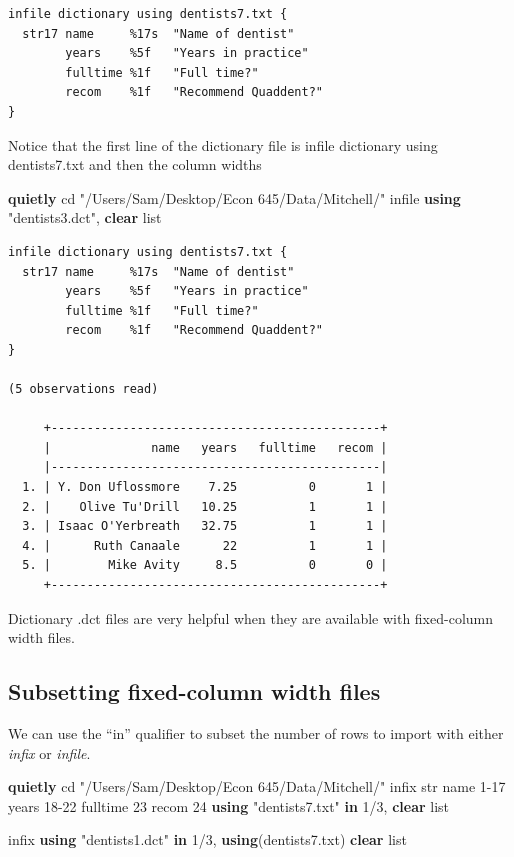 \documentclass[
]{book}
\newenvironment{Shaded}{\begin{snugshade}}{\end{snugshade}}
\newcommand{\BaseNTok}[1]{\textcolor[rgb]{0.00,0.00,0.81}{#1}}
\newcommand{\KeywordTok}[1]{\textcolor[rgb]{0.13,0.29,0.53}{\textbf{#1}}}
\newcommand{\NormalTok}[1]{#1}
\newcommand{\OtherTok}[1]{\textcolor[rgb]{0.56,0.35,0.01}{#1}}
\newcommand{\StringTok}[1]{\textcolor[rgb]{0.31,0.60,0.02}{#1}}
\begin{document}
\begin{verbatim}
infile dictionary using dentists7.txt {
  str17 name     %17s  "Name of dentist"
        years    %5f   "Years in practice"
        fulltime %1f   "Full time?"
        recom    %1f   "Recommend Quaddent?"
}
\end{verbatim}

Notice that the first line of the dictionary file is
infile dictionary using dentists7.txt and then the column widths

\begin{Shaded}
\begin{Highlighting}[]
\KeywordTok{quietly}\NormalTok{ cd }\StringTok{"/Users/Sam/Desktop/Econ 645/Data/Mitchell/"}
\NormalTok{infile }\KeywordTok{using} \StringTok{"dentists3.dct"}\NormalTok{, }\KeywordTok{clear}
\OtherTok{list}
\end{Highlighting}
\end{Shaded}

\begin{verbatim}
infile dictionary using dentists7.txt {
  str17 name     %17s  "Name of dentist"
        years    %5f   "Years in practice"
        fulltime %1f   "Full time?"
        recom    %1f   "Recommend Quaddent?"
}

(5 observations read)

     +----------------------------------------------+
     |              name   years   fulltime   recom |
     |----------------------------------------------|
  1. | Y. Don Uflossmore    7.25          0       1 |
  2. |    Olive Tu'Drill   10.25          1       1 |
  3. | Isaac O'Yerbreath   32.75          1       1 |
  4. |      Ruth Canaale      22          1       1 |
  5. |        Mike Avity     8.5          0       0 |
     +----------------------------------------------+
\end{verbatim}

Dictionary .dct files are very helpful when they are available with fixed-column width files.

\subsection{Subsetting fixed-column width files}\label{subsetting-fixed-column-width-files}

We can use the ``in'' qualifier to subset the number of rows to import with either \emph{infix} or \emph{infile}.

\begin{Shaded}
\begin{Highlighting}[]
\KeywordTok{quietly}\NormalTok{ cd }\StringTok{"/Users/Sam/Desktop/Econ 645/Data/Mitchell/"}
\NormalTok{infix str }\BaseNTok{name}\NormalTok{ 1{-}17 years 18{-}22 fulltime 23 recom 24 }\KeywordTok{using} \StringTok{"dentists7.txt"} \KeywordTok{in}\NormalTok{ 1/3, }\KeywordTok{clear}
\OtherTok{list}

\NormalTok{infix }\KeywordTok{using} \StringTok{"dentists1.dct"} \KeywordTok{in}\NormalTok{ 1/3, }\KeywordTok{using}\NormalTok{(dentists7.txt) }\KeywordTok{clear}
\OtherTok{list}
\end{Highlighting}
\end{Shaded}
\end{document}
